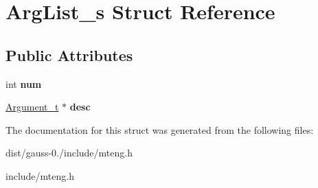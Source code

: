 \hypertarget{struct_arg_list__s}{\section{Arg\-List\-\_\-s Struct Reference}
\label{struct_arg_list__s}
}
\subsection*{Public Attributes}
\begin{DoxyCompactItemize}
\item 
\hypertarget{struct_arg_list__s_acd9bcd47c0d1cbe614b674e359794d56}{int {\bfseries num}}\label{struct_arg_list__s_acd9bcd47c0d1cbe614b674e359794d56}

\item 
\hypertarget{struct_arg_list__s_a97e56417d6025c2656e2bb8c5efed04b}{\hyperlink{struct_argument__s}{Argument\-\_\-t} $\ast$ {\bfseries desc}}\label{struct_arg_list__s_a97e56417d6025c2656e2bb8c5efed04b}

\end{DoxyCompactItemize}


The documentation for this struct was generated from the following files\-:\begin{DoxyCompactItemize}
\item 
dist/gauss-\/0./include/mteng.\-h\item 
include/mteng.\-h\end{DoxyCompactItemize}
